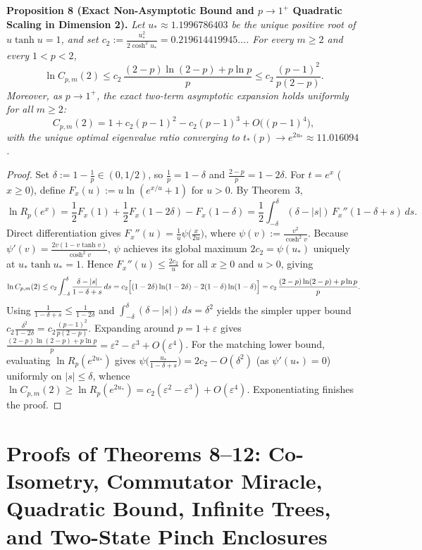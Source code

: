 \documentclass[10pt,letterpaper]{article}
\begin{document}
\begin{tcolorbox}[lemmabox]
\textbf{Proposition 8 (Exact Non-Asymptotic Bound and $p \to 1^+$ Quadratic Scaling in Dimension 2).}
\emph{Let $u_* \approx 1.1996786403$ be the unique positive root of $u \tanh u = 1$, and set $c_2 := \frac{u_*^2}{2\cosh^2 u_*} = 0.219614419945\dots$. For every $m \ge 2$ and every $1 < p < 2$,}
\[
  \ln C_{p,m}(2) \le c_2\,\frac{(2-p)\ln(2-p) + p\ln p}{p} \le c_2\,\frac{(p-1)^2}{p(2-p)}.
\]
\emph{Moreover, as $p \to 1^+$, the exact two-term asymptotic expansion holds uniformly for all $m \ge 2$:}
\[
  C_{p,m}(2) = 1 + c_2(p - 1)^2 - c_2(p - 1)^3 + O\bigl((p - 1)^4\bigr),
\]
\emph{with the unique optimal eigenvalue ratio converging to $t_*(p) \to e^{2u_*} \approx 11.016094$.}
\end{tcolorbox}

\begin{proof}
Set $\delta := 1 - \frac{1}{p} \in (0, 1/2)$, so $\frac{1}{p} = 1 - \delta$ and $\frac{2-p}{p} = 1 - 2\delta$. For $t = e^x$ ($x \ge 0$), define $F_x(u) := u\ln(e^{x/u} + 1)$ for $u > 0$. By Theorem~3,
\[
  \ln R_p(e^x) = \frac{1}{2}F_x(1) + \frac{1}{2}F_x(1 - 2\delta) - F_x(1 - \delta)
  = \frac{1}{2}\int_{-\delta}^{\delta} (\delta - |s|)\,F_x''(1 - \delta + s)\,ds.
\]
Direct differentiation gives $F_x''(u) = \frac{1}{u}\psi\bigl(\frac{x}{2u}\bigr)$, where $\psi(v) := \frac{v^2}{\cosh^2 v}$. Because $\psi'(v) = \frac{2v(1 - v\tanh v)}{\cosh^2 v}$, $\psi$ achieves its global maximum $2c_2 = \psi(u_*)$ uniquely at $u_* \tanh u_* = 1$. Hence $F_x''(u) \le \frac{2c_2}{u}$ for all $x \ge 0$ and $u > 0$, giving
\[
  \ln C_{p,m}(2) \le c_2\int_{-\delta}^{\delta} \frac{\delta - |s|}{1 - \delta + s}\,ds
  = c_2\Bigl[(1-2\delta)\ln(1-2\delta) - 2(1-\delta)\ln(1-\delta)\Bigr]
  = c_2\,\frac{(2-p)\ln(2-p) + p\ln p}{p}.
\]
Using $\frac{1}{1-\delta+s} \le \frac{1}{1-2\delta}$ and $\int_{-\delta}^{\delta}(\delta-|s|)\,ds = \delta^2$ yields the simpler upper bound $c_2\frac{\delta^2}{1-2\delta} = c_2\frac{(p-1)^2}{p(2-p)}$. Expanding around $p = 1 + \varepsilon$ gives $\frac{(2-p)\ln(2-p) + p\ln p}{p} = \varepsilon^2 - \varepsilon^3 + O(\varepsilon^4)$. For the matching lower bound, evaluating $\ln R_p(e^{2u_*})$ gives $\psi\bigl(\frac{u_*}{1-\delta+s}\bigr) = 2c_2 - O(\delta^2)$ (as $\psi'(u_*) = 0$) uniformly on $|s| \le \delta$, whence $\ln C_{p,m}(2) \ge \ln R_p(e^{2u_*}) = c_2(\varepsilon^2 - \varepsilon^3) + O(\varepsilon^4)$. Exponentiating finishes the proof.
\end{proof}

\section{Proofs of Theorems 8--12: Co-Isometry, Commutator Miracle, Quadratic Bound, Infinite Trees, and Two-State Pinch Enclosures}
\end{document}
